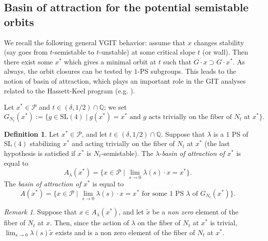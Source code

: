 \documentclass[11pt]{amsart}
\numberwithin{equation}{section}
\theoremstyle{plain}
\theoremstyle{remark}
\newtheorem{remark}[theorem]{Remark}
\theoremstyle{definition}
\newtheorem{definition}[theorem]{Definition}
\newcommand{\SL}{\mathrm{SL}}
\newcommand{\cP}{{\mathscr P}}
\newcommand{\QQ}{{\mathbb Q}}
\newcommand{\wt}{\widetilde}
\begin{document}
%
 \subsection{Basin of attraction for the potential semistable orbits}\label{subsec:sectbasin}
 We recall the following general VGIT behavior: assume that $x$ changes stability (say goes from $t$-semistable to $t$-unstable) at some critical slope $t$ (or wall). Then there exist some $x^*$ which gives a minimal orbit at $t$ such that $\overline{G\cdot x}\supset G\cdot x^*$. As always, the orbit closures can be tested by $1$-PS subgroups. This leads to the notion of basin of attraction, which plays an important role in the GIT analyses related to the Hassett-Keel program (e.g. \cite{hh2}). 
 
 Let $x^*\in \cP$ and $t\in(\delta,1/2)\cap\QQ$; we set
 \begin{equation}
%
G_{N_t}(x^{*}):=\{g\in\SL(4) \mid \text{$g(x^*)=x^{*}$ and $g$ acts trivially on the fiber of $N_t$ at $x^{*}$}\}.
%
\end{equation}
%
%
 \begin{definition}
Let $x^*\in \cP$, and let $t\in(\delta,1/2)\cap\QQ$. Suppose that  $\lambda$ is a $1$ PS of $\SL(4)$ stabilizing $x^{*}$ and acting trivially on the fiber of $N_t$ at $x^{*}$ (the last hypothesis is satisfied if $x^{*}$ is $N_t$-semistable).   
    The $\lambda$-\emph{basin of attraction of $x^{*}$} is equal to 
%
 $$A_{\lambda}(x^*)=\{x\in \cP\mid \lim_{s\to 0} \lambda(s)\cdot x=x^* \}.$$
The \emph{basin of attraction of $x^{*}$} is equal to 
%
 $$A(x^*)=\{x\in \cP\mid \text{$\lim_{s\to 0} \lambda(s)\cdot x=x^*$ for some $1$ PS $\lambda$ of $G_{N_t}(x^*)$} \}.$$
 \end{definition}
\begin{remark}\label{rmk:sollevo}
%
Suppose that $x\in A_{\lambda}(x^*)$, and let $\wt{x}$ be a \emph{non zero} element of the fiber of $N_t$ at $x$. Then, since the action of  $\lambda$  on the fiber of $N_t$ at $x^{*}$ is trivial, 
$\lim_{s\to 0}\lambda(s)\wt{x}$ exists and is a non zero element of the fiber of $N_t$ at $x^*$.
%
\end{remark}

 
\end{document}
